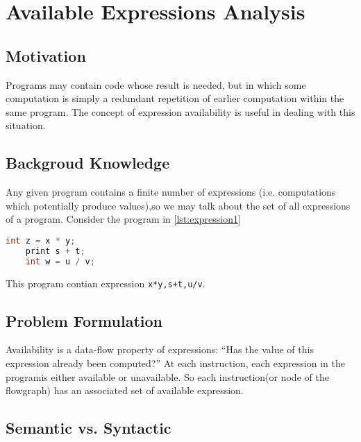 \newpage

\section{Available Expressions Analysis}

\subsection{Motivation}

Programs may contain code whose result is needed, but in which some computation is simply a redundant
repetition of earlier computation within the same program. The concept of expression availability is useful in dealing with this situation.


\subsection{Backgroud Knowledge}

Any given program contains a finite number of expressions (i.e. computations which potentially
produce values),so we may talk about the set of all expressions of a program. Consider the program in
\ref{lst:expression1}




\begin{lstlisting}[language=C,frame=single, caption=An simple example containing some expressions ,label = lst:expression1]
    int z = x * y; 
    print s + t; 
    int w = u / v;
\end{lstlisting}


This program contian expression \texttt{x*y,s+t,u/v}.



\subsection{Problem Formulation}


Availability is a data-flow property of expressions: “Has the value of this expression already been computed?”
At each instruction, each expression in the programis either available or unavailable. So each instruction(or node of the flowgraph) has
an associated set of available expression.



\subsection{Semantic vs. Syntactic}

